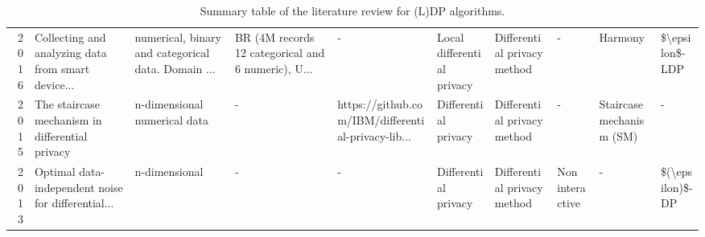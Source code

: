 \begin{landscape}
\begin{table}[ht]
\begin{adjustbox}{width=1.8\textwidth}
\begin{tabular}{rlllllllll}
        2016 \citep{nguyen_collecting_2016} & Collecting and analyzing data from smart device... & numerical, binary and categorical data. Domain ... & BR (4M records 12 categorical and 6 numeric), U... & -                                                  & Local differential privacy & Differential privacy method & -               & Harmony                  & \$\textbackslash epsilon\$-LDP  \\
        2015 \citep{geng_staircase_2015}    & The staircase mechanism in differential privacy    & n-dimensional numerical data                       & -                                                  & https://github.com/IBM/differential-privacy-lib... & Differential privacy       & Differential privacy method & -               & Staircase mechanism (SM) & -                               \\
        2013 \citep{geng_optimal_2013}      & Optimal data-independent noise for differential... & n-dimensional                                      & -                                                  & -                                                  & Differential privacy       & Differential privacy method & Non interactive & -                        & \$(\textbackslash epsilon)\$-DP \\
        \bottomrule
      \end{tabular}
    \end{adjustbox}
    \caption{Summary table of the literature review for (L)DP algorithms.}
    \label{tab:summary_table_dp}
  \end{table}
\end{landscape}
